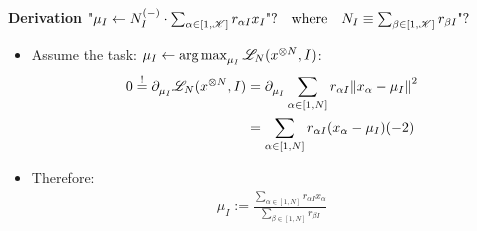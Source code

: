 \begin{frame} [t]
      {\bf Derivation}
    $  \textnormal{"}
       \mu _{I} 
      \leftarrow 
        N _{I} ^{(-)} 
      \cdot 
        \sum 
         _{\alpha \in [1,\mathscr{K}]}
        r _{\alpha I} x _{I}
      \textnormal {"?}
      \qq {where}
       N _{I} 
      \equiv    
       \sum 
            _{\beta \in [1,\mathscr{K}]}
       r _{\beta I}
       \textnormal {"?}
    $
    \begin{itemize}
        \item Assume the task:
        $ \mu _{I} \leftarrow 
          \operatorname*{\textnormal{arg}\,\textnormal{max}} _{\mu _{I}}
          \mathscr {L} _{N} (x ^{\otimes N}, I)
        $:
        { \footnotesize 
        \begin{align*}
            0
          \overset {!} {=}
            \partial ^{} _{\mu _{I}} {} 
            \mathscr {L} _{N} (x ^{\otimes N}, I)
          & = 
           \partial ^{} _{\mu _{I}} {} 
            \sum 
              _{\alpha \in [1, N]}
            r _{\alpha I}  
            \norm {x _{\alpha} - \mu _{I}} ^{2}
          \\ & =
            \sum 
              _{\alpha \in [1, N]}
               r _{\alpha I}
               (x _{\alpha} - \mu _{I}) 
               (-2) 
        \end{align*}
        }
    \item Therefore:
        { \footnotesize 
        \begin{align*} 
            \mu _{I} :=
            \frac 
            { \sum _{\alpha \in [1, N]} 
              r _{\alpha I} x _{\alpha}
            }
            { \sum _{\beta \in [1, N]} 
              r _{\beta I}
            }
        \end{align*} 
        }       
    \end{itemize}  
\end{frame}


